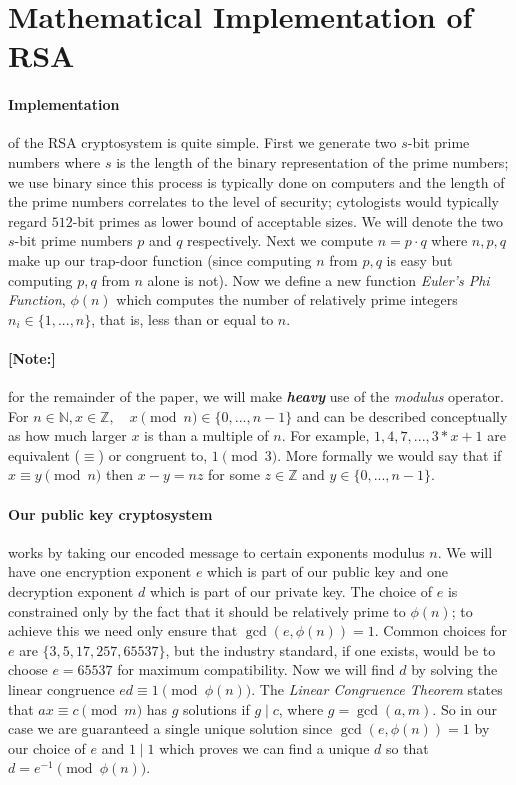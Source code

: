\documentclass[12pt]{article}
\newcommand{\Z}{\mathbb{Z}}
\newcommand{\N}{\mathbb{N}}
\begin{document}
\section{Mathematical Implementation of RSA}

\paragraph{Implementation} of the RSA cryptosystem is quite simple.  First we generate two $s$-bit prime numbers where $s$ is the length of the binary representation of the prime numbers; we use binary since this process is typically done on computers and the length of the prime numbers correlates to the level of security; cytologists would typically regard $512$-bit primes as lower bound of acceptable sizes.  We will denote the two $s$-bit prime numbers $p$ and $q$ respectively.  Next we compute $n = p\cdot q$ where $n,p,q$ make up our trap-door function (since computing $n$ from $p,q$ is easy but computing $p,q$ from $n$ alone is not).  Now we define a new function \textit{Euler's Phi Function}, $\phi(n)$ which computes the number of relatively prime integers $n_i\in\{1,...,n\}$, that is, less than or equal to $n$.

\paragraph{[Note:]} for the remainder of the paper, we will make \textbf{\emph{heavy}} use of the \textit{modulus} operator.  For $n\in \N,x\in \Z ,\quad x\pmod{n}\in \{0,...,n-1\}$ and can be described conceptually as how much larger $x$ is than a multiple of $n$.  For example, $1,4,7,..., 3*x+1$ are equivalent ($\equiv$) or congruent to, $1\pmod{3}$.  More formally we would say that if $x\equiv y\pmod{n}$ then $x-y = nz$ for some $z\in\Z$ and $y\in \{0,...,n-1\}$.

\paragraph{Our public key cryptosystem} works by taking our encoded message to certain exponents modulus $n$.  We will have one encryption exponent $e$ which is part of our public key and one decryption exponent $d$ which is part of our private key.  The choice of $e$ is constrained only by the fact that it should be relatively prime to $\phi(n)$; to achieve this we need only ensure that $\gcd(e,\phi(n))=1$.  Common choices for $e$ are $\{3, 5, 17, 257, 65537\}$, but the industry standard, if one exists, would be to choose $e=65537$ for maximum compatibility.  Now we will find $d$ by solving the linear congruence $ed \equiv 1 \pmod{\phi(n)}$.  The \textit{Linear Congruence Theorem} states that $ax \equiv c \pmod{m}$ has $g$ solutions if $g \mid c$, where $g=\gcd(a,m)$.  So in our case we are guaranteed a single unique solution since $\gcd(e,\phi(n))=1$ by our choice of $e$ and $1\mid 1$ which proves we can find a unique $d$ so that $d=e^{-1}\pmod{\phi(n)}$.
\end{document}
